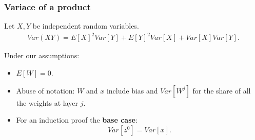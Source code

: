 


\begin{frame}
  \frametitle{Variace of a product}
  Let $X,Y$ be independent random variables. 
  \begin{align}
    Var\left(X Y\right) 
    = 
    E[X]^2 Var[Y] + E[Y]^2 Var[X]  +  Var[X] Var[Y]. 
  \end{align} 
  

  Under our assumptions: 

  \begin{itemize}
    \item $E[W] = 0$.
    \item Abuse of notation:  $W$ and $x$ include bias and  $Var[W^j]$ 
    for the share of all the weights at layer $j$. 
    \item For an induction proof the \textbf{base case}:
    \begin{equation}
      \label{eq:base_case_induction}
      Var\left[ z^0 \right]
      = 
      Var\left[ x \right]. 
    \end{equation}
  \end{itemize}


\end{frame}


